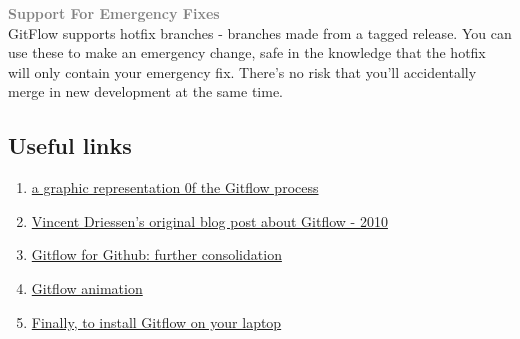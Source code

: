 \documentclass{tufte-handout}
\begin{document}
		\textbf{\textcolor{gray}{Support For Emergency Fixes}}\\
		GitFlow supports hotfix branches -
		branches made from a tagged release. You can use these to make an
		emergency change, safe in the knowledge that the hotfix will only
		contain your emergency fix. There's no risk that you'll accidentally
		merge in new development at the same time.
		
		\clearpage
		
		\subsection{Useful links}
		
		\begin{enumerate}
			\def\labelenumi{\arabic{enumi}.}
			\item
			\href{https://danielkummer.github.io/git-flow-cheatsheet/#features}{a graphic representation 0f the Gitflow process}
			\item
			\href{https://nvie.com/posts/a-successful-git-branching-model/}{Vincent Driessen's original blog post about Gitflow - 2010}
			\item
			\href{https://datasift.github.io/gitflow/GitFlowForGitHub.html}{Gitflow for Github: further consolidation}
			\item
			\href{https://veerasundar.com/blog/2018/03/gitflow-animated/}{Gitflow animation}
			\item
			\href{https://github.com/nvie/gitflow/}{Finally, to install Gitflow on your laptop}
		\end{enumerate}
	
\end{document}
